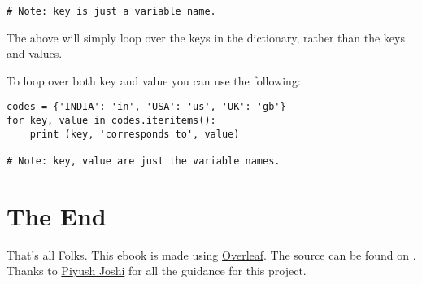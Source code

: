 \documentclass[a4paper,9pt]{extarticle}
\begin{document}
\begin{multicols*}{2}
\begin{lstlisting}
# Note: key is just a variable name.
\end{lstlisting}
The above will simply loop over the keys in the dictionary, rather than the keys and values.

To loop over both key and value you can use the following:
\begin{lstlisting}
codes = {'INDIA': 'in', 'USA': 'us', 'UK': 'gb'}
for key, value in codes.iteritems():
    print (key, 'corresponds to', value)

# Note: key, value are just the variable names.
\end{lstlisting}

\section{The End}
That's all Folks.\newline
This ebook is made using \href{https://overleaf.com}{Overleaf}. \newline The source can be found on \href{https://github.com/akashp1712/python_cheat_sheets}{\LARGE{\faGithub}}. \newline
Thanks to \faLinkedin{} \href{https://www.linkedin.com/in/piyush-joshi-b7525216/}{Piyush Joshi} for all the guidance for this project.

\end{multicols*}
\end{document}
